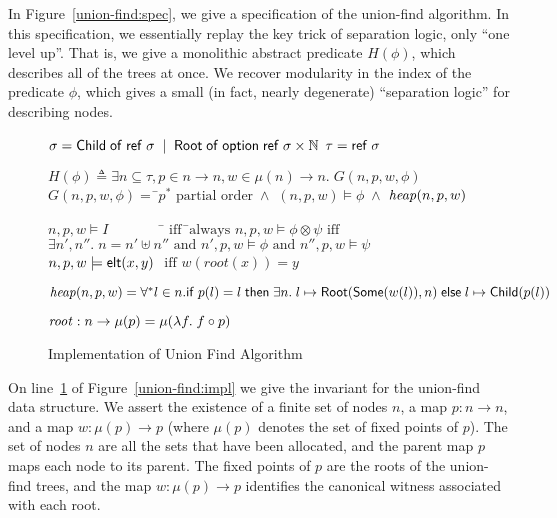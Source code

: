 In Figure~\ref{union-find:spec}, we give a specification of the
union-find algorithm. In this specification, we essentially replay the
key trick of separation logic, only ``one level up''. That is, we give
a monolithic abstract predicate $H(\phi)$, which describes all of the
trees at once. We recover modularity in the index of the predicate
$\phi$, which gives a small (in fact, nearly degenerate) ``separation
logic'' for describing nodes. 

\begin{figure}
\mbox{}
\begin{specification}
\nextline $\sigma = \mathsf{Child} \;\mathsf{of}\; \mathsf{ref}\;\sigma \;\;|\;\; \mathsf{Root} \;\mathsf{of}\; \mathsf{option }{\;}{\mathsf{ref}\;\sigma} \times \mathbb{N}$ 
\nextline $\tau = \mathsf{ref}\;\sigma$ 

   $H(\phi) \triangleq \exists n \subseteq \tau, p \in n \to n, w \in \mu(n) \to n.\;G(n,p,w,\phi)$
\nextline[1em] $G(n, p, w, \phi) =\;$\=$p^{*} \mbox{ partial order} \;\land$ 
\nextline \> $(n, p, w) \models \phi \;\land$
\nextline \> $\mathit{heap}(n, p, w)$ 

\nextline[1em] $n, p, w \models I \qquad\qquad$\=$\mbox{ iff}\;\;$\=$\mbox{always}$ 
\nextline      $n, p, w \models \phi \otimes \psi$\>$\mbox{ iff}$\>$
                     \exists n', n''.\; n = n' \uplus n'' \mbox{ and } n', p, w \models \phi \mbox{ and } 
                     n'', p, w \models \psi$
\nextline      $n, p, w \models \mathsf{elt}({x}, {y})$ \> $\mbox{ iff }$\>$w(\mathit{root}(x)) = y$

\nextline[1em] $\mathit{heap}(n, p, w) =  \forall^{*} l \in n. \mathsf{if}\;{p(l) = l}\;\mathsf{then}\;{\exists n.\; l \mapsto \mathsf{Root}(\mathsf{Some}(w(l)), n)}\;\mathsf{else}\;{l \mapsto \mathsf{Child}(p(l))}$

\nextline[1em] $\mathit{root} : n \to \mu(p) = \mu(\lambda f.\;f \circ p)$
\end{specification}
\caption{Implementation of Union Find Algorithm}
\label{union-find:invariant}
\end{figure}
 
On line~\ref{union-find:invariant} of Figure~\ref{union-find:impl} we
give the invariant for the union-find data structure. We assert the
existence of a finite set of nodes $n$, a map $p : n \to n$, and a map
$w : \mu(p) \to p$ (where $\mu(p)$ denotes the set of fixed points of
$p$). The set of nodes $n$ are all the sets that have been allocated,
and the parent map $p$ maps each node to its parent. The fixed points
of $p$ are the roots of the union-find trees, and the map $w : \mu(p)
\to p$ identifies the canonical witness associated with each root.

